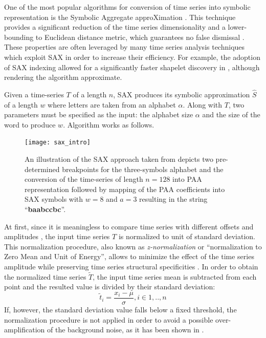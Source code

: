 One of the most popular algorithms for conversion of time series into symbolic representation is the Symbolic Aggregate approXimation \cite{sax}. 
This technique provides a significant reduction of the time series dimensionality and a lower-bounding to Euclidean distance 
metric, which guarantees no false dismissal \cite{citeulike:2821475}. 
These properties are often leveraged by many time series analysis techniques which exploit SAX in order to increase their efficiency. 
For example, the adoption of SAX indexing allowed for a significantly faster shapelet discovery in \cite{citeulike:12563493}, 
although rendering the algorithm approximate. 

Given a time-series $T$ of a length $n$, SAX produces its symbolic approximation $\hat{S}$ of a length $w$ where letters are taken 
from an alphabet $\alpha$. Along with $T$, two parameters must be specified as the input: the alphabet size $\alpha$ and the size of 
the word to produce $w$. Algorithm works as follows. 

\begin{figure}[tbp]
   \centering
   \texttt{[image: sax\_intro]}
   \caption{An illustration of the SAX approach taken from \cite{citeulike:2821475} depicts two pre-determined breakpoints for the 
   three-symbols alphabet and the conversion of the time-series of length $n=128$ into PAA representation followed by mapping of 
   the PAA coefficients into SAX symbols with $w=8$ and $a=3$ resulting in the string ``\textbf{baabccbc}''.}
   \label{fig:sax_intro}
\end{figure}

At first, since it is meaningless to compare time series with different offsets and amplitudes \cite{citeulike:532340}, the input time 
series $T$ is normalized to unit of standard deviation. This normalization procedure, also known as \textit{z-normalization} or 
``normalization to Zero Mean and Unit of Energy'', allows to minimize the effect of the time series amplitude while preserving time 
series structural specificities \cite{citeulike:3815880}. In order to obtain the normalized time series $\widetilde{T}$, the 
input time series mean is subtracted from each point and the resulted value is divided by their standard deviation:
\begin{equation}
\widetilde{t}_{i} = \frac{x_{i}-\mu}{\sigma}, i \in {1,..,n}
\label{eq:znorm}
\end{equation}
If, however, the standard deviation value falls below a fixed threshold, the normalization procedure is not applied in order to avoid 
a possible over-amplification of the background noise, as it has been shown in \cite{citeulike:2821475}.

